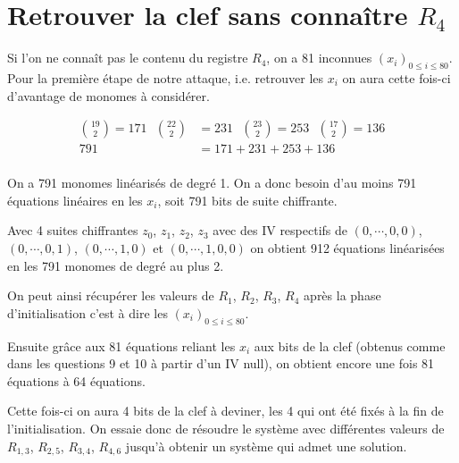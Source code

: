 \section{Retrouver la clef sans connaître $R_4$}

Si l'on ne connaît pas le contenu du registre $R_4$, on a 81 inconnues $(x_i)_{0\leq i \leq 80}$. \\
Pour la première étape de notre attaque, i.e. retrouver les $x_i$ on aura cette fois-ci d'avantage de monomes à considérer.

\begin{align*}
    \binom{19}{2}=171\ \ \ \binom{22}{2}&=231\ \ \ \binom{23}{2}=253\ \ \ \binom{17}{2}=136\\
    791&=171+231+253+136\\
\end{align*}

On a 791 monomes linéarisés de degré 1. On a donc besoin d'au moins 791 équations linéaires en les $x_i$, soit 791 bits de suite chiffrante.

Avec 4 suites chiffrantes $z_0$, $z_1$, $z_2$, $z_3$ avec des IV respectifs de $(0,\cdots ,0,0)$, $(0,\cdots ,0,1)$, $(0,\cdots ,1,0)$ et $(0,\cdots ,1,0,0)$ on obtient 912 équations linéarisées en les 791 monomes de degré au plus 2.

On peut ainsi récupérer les valeurs de $R_1$, $R_2$, $R_3$, $R_4$ après la phase d'initialisation c'est à dire les $(x_i)_{0\leq i \leq 80}$. 

Ensuite grâce aux 81 équations reliant les $x_i$ aux bits de la clef (obtenus comme dans les questions 9 et 10 à partir d'un IV null), on obtient encore une fois 81 équations à 64 équations.

Cette fois-ci on aura 4 bits de la clef à deviner, les 4 qui ont été fixés à la fin de l'initialisation. On essaie donc de résoudre le système avec différentes valeurs de $R_{1,3}$, $R_{2,5}$, $R_{3,4}$, $R_{4,6}$ jusqu'à obtenir un système qui admet une solution.
